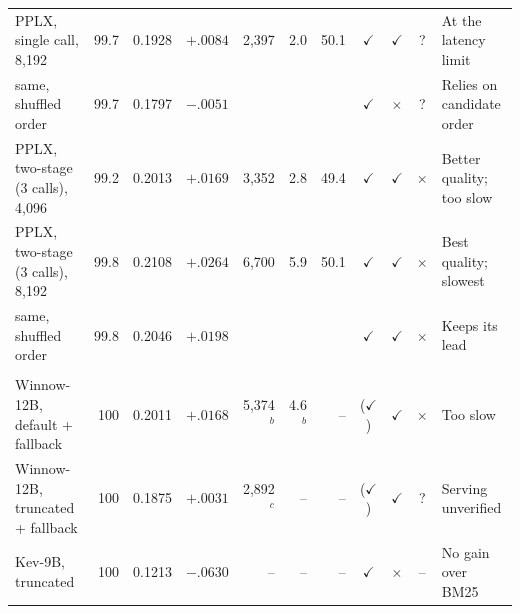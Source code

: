 \begin{table}[t]
\begin{tabular}{@{}l r r r r r r ccc l@{}}
PPLX, single call, 8,192 & 99.7 & 0.1928 & $+.0084$ & 2,397 & 2.0 & 50.1 & \textcolor{cPass!70!black}{$\checkmark$} & \textcolor{cPass!70!black}{$\checkmark$} & \textcolor{black!55}{?} & At the latency limit\\
\quad same, shuffled order & 99.7 & 0.1797 & $-.0051$ &  &  &  & \textcolor{cPass!70!black}{$\checkmark$} & \textcolor{cFail}{$\times$} & \textcolor{black!55}{?} & Relies on candidate order\\
PPLX, two-stage (3 calls), 4,096 & 99.2 & 0.2013 & $+.0169$ & 3,352 & 2.8 & 49.4 & \textcolor{cPass!70!black}{$\checkmark$} & \textcolor{cPass!70!black}{$\checkmark$} & \textcolor{cFail}{$\times$} & Better quality; too slow\\
PPLX, two-stage (3 calls), 8,192 & 99.8 & 0.2108 & $+.0264$ & 6,700 & 5.9 & 50.1 & \textcolor{cPass!70!black}{$\checkmark$} & \textcolor{cPass!70!black}{$\checkmark$} & \textcolor{cFail}{$\times$} & Best quality; slowest\\
\quad same, shuffled order & 99.8 & 0.2046 & $+.0198$ &  &  &  & \textcolor{cPass!70!black}{$\checkmark$} & \textcolor{cPass!70!black}{$\checkmark$} & \textcolor{cFail}{$\times$} & Keeps its lead\\
\addlinespace[2pt]\multicolumn{11}{@{}l}{\textit{Other decision models}}\\[1pt]
Winnow-12B, default + fallback & 100 & 0.2011 & $+.0168$ & 5,374$^b$ & 4.6$^b$ & -- & \textcolor{cPass!70!black}{($\checkmark$)} & \textcolor{cPass!70!black}{$\checkmark$} & \textcolor{cFail}{$\times$} & Too slow\\
Winnow-12B, truncated + fallback & 100 & 0.1875 & $+.0031$ & 2,892$^c$ & -- & -- & \textcolor{cPass!70!black}{($\checkmark$)} & \textcolor{cPass!70!black}{$\checkmark$} & \textcolor{black!55}{?} & Serving unverified\\
Kev-9B, truncated & 100 & 0.1213 & $-.0630$ & -- & -- & -- & \textcolor{cPass!70!black}{$\checkmark$} & \textcolor{cFail}{$\times$} & \textcolor{black!40}{--} & No gain over BM25\\
\bottomrule\end{tabular}
\end{table}
